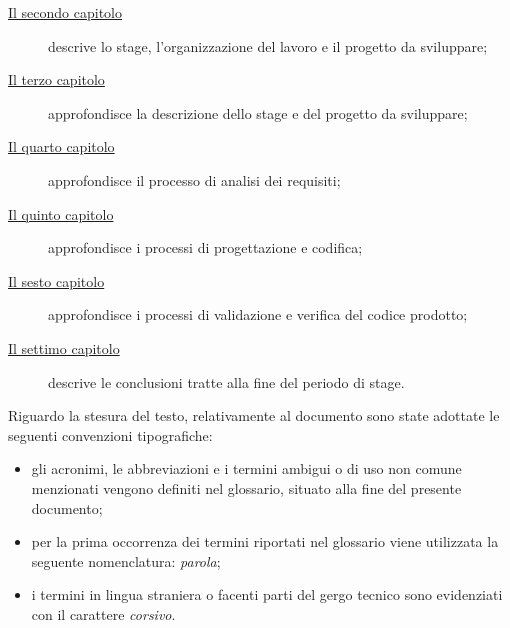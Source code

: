 \begin{description}
    \item[{\hyperref[cap:processi-metodologie]{Il secondo capitolo}}] descrive lo stage, l'organizzazione del lavoro e il progetto da sviluppare;
    
    \item[{\hyperref[cap:descrizione-stage]{Il terzo capitolo}}] approfondisce la descrizione dello stage e del progetto da sviluppare;
    
    \item[{\hyperref[cap:analisi-requisiti]{Il quarto capitolo}}] approfondisce il processo di analisi dei requisiti;
    
    \item[{\hyperref[cap:progettazione-codifica]{Il quinto capitolo}}] approfondisce i processi di progettazione e codifica;
    
    \item[{\hyperref[cap:verifica-validazione]{Il sesto capitolo}}] approfondisce i processi di validazione e verifica del codice prodotto;
    
    \item[{\hyperref[cap:conclusioni]{Il settimo capitolo}}] descrive le conclusioni tratte alla fine del periodo di stage.
\end{description}

Riguardo la stesura del testo, relativamente al documento sono state adottate le seguenti convenzioni tipografiche:
\begin{itemize}
	\item gli acronimi, le abbreviazioni e i termini ambigui o di uso non comune menzionati vengono definiti nel glossario, situato alla fine del presente documento;
	\item per la prima occorrenza dei termini riportati nel glossario viene utilizzata la seguente nomenclatura: \emph{parola}\glsfirstoccur;
	\item i termini in lingua straniera o facenti parti del gergo tecnico sono evidenziati con il carattere \emph{corsivo}.
\end{itemize}